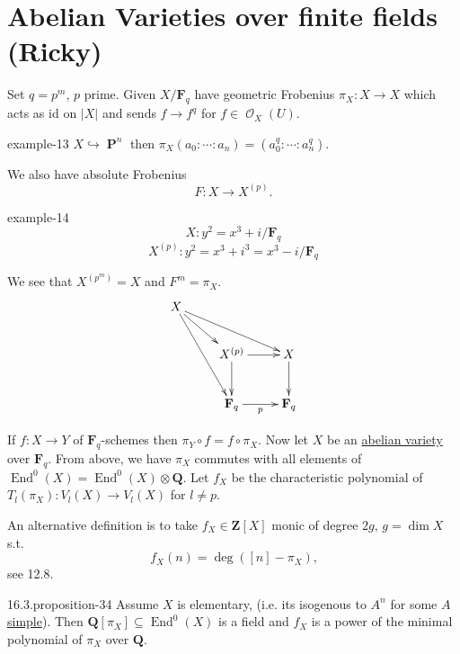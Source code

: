 \documentclass[10pt,]{book}
\numberwithin{equation}{section}
\newcommand{\sheaf}[1]{\operatorname{\mathcal{#1}}}
\newcommand{\lb}{[}
\newcommand{\rb}{]}
\newcommand{\ZZ}{\mathbf{Z}}
\newcommand{\QQ}{\mathbf{Q}}
\newcommand{\FF}{\mathbf{F}}
\newcommand{\id}{\mathrm{id}}
\DeclareMathOperator{\End}{End}
\DeclareMathOperator{\PP}{\mathbf{P}}
\begin{document}
\section[{Abelian Varieties over finite fields (Ricky)}]{Abelian Varieties over finite fields (Ricky)}\label{sec-avs-over-ffs}
\hypertarget{p-356}{}%
Set \(q = p^m\), \(p\) prime. Given \(X/\FF_q\) have  geometric Frobenius \(\pi_X\colon X \to X\) which acts as \(\id\) on \(|X|\) and sends \(f\to f^q\) for \(f\in \sheaf O_X(U)\).%
\begin{example}{}{example-13}%
\hypertarget{p-357}{}%
\(X \hookrightarrow \PP^n\) then \(\pi_X(a_0:\cdots :a_n) = (a_0^q : \cdots :a_n^q)\).%
\end{example}
\hypertarget{p-358}{}%
We also have absolute Frobenius%
\begin{equation*}
F\colon X\to X^{(p)}\text{.}
\end{equation*}
%
\begin{example}{}{example-14}%
\hypertarget{p-359}{}%
%
\begin{equation*}
X \colon y^2 = x^3 + i / \FF_q
\end{equation*}
%
\begin{equation*}
X^{(p)} \colon y^2 = x^3 + i^3 = x^3 - i / \FF_q
\end{equation*}
%
\end{example}
\hypertarget{p-360}{}%
We see that \(X^{(p^m)} = X\) and \(F^m = \pi_X\).%
\begin{equation*}
\xymatrix{
X \ar[drr] \ar[dr]\ar[ddr] & &\\
& X^{(p)} \ar[d]\ar[r] & X\ar[d]\\
& \FF_q \ar[r]_p &\FF_q
}
\end{equation*}
%
\par
\hypertarget{p-361}{}%
If \(f\colon X \to Y\) of \(\FF_q\)-schemes then \(\pi_Y \circ f = f\circ \pi_X\). Now let \(X\) be an \hyperref[def-buntes-abvar]{abelian variety} over \(\FF_q\). From above, we have \(\pi_X\) commutes with all elements of \(\End^0(X) = \End^0(X)\otimes \QQ\). Let \(f_X\) be the characteristic polynomial of \(T_l(\pi_X) \colon V_l(X) \to V_l(X)\) for \(l \ne p\).%
\par
\hypertarget{p-362}{}%
An alternative definition is to take \(f_X\in \ZZ\lb X\rb\) monic of degree \(2g \), \(g = \dim X\) s.t.%
\begin{equation*}
f_X(n) = \deg([n] -\pi_X)\text{,}
\end{equation*}
see 12.8.%
\begin{proposition}{16.3.}{}{proposition-34}%
\hypertarget{p-363}{}%
Assume \(X\) is elementary, (i.e. its isogenous to \(A^n\) for some \(A\) \hyperref[def-simple-av]{simple}). Then  \(\QQ\lb \pi_X\rb\subseteq \End^0(X)\) is a field and \(f_X\) is a power of the minimal polynomial of \(\pi_X\) over \(\QQ\).%
\end{proposition}
\end{document}
